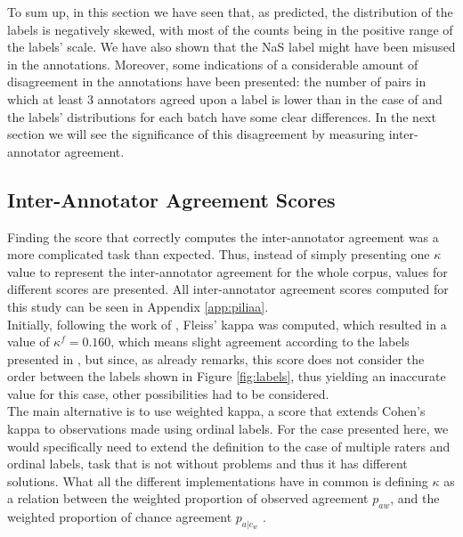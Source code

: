 To sum up, in this section we have seen that, as predicted, the distribution of the labels is negatively skewed, with most of the counts being in the positive range of the labels' scale. We have also shown that the NaS label might have been misused in the annotations. Moreover, some indications of a considerable amount of disagreement in the annotations have been presented: the number of pairs in which at least 3 annotators agreed upon a label is lower than in the case of \citet{de2012did} and the labels' distributions for each batch have some clear differences. In the next section we will see the significance of this disagreement by measuring inter-annotator agreement.\\ 

\subsection{Inter-Annotator Agreement Scores}

Finding the score that correctly computes the inter-annotator agreement was a more complicated task than expected. Thus, instead of simply presenting one $\kappa$ value to represent the inter-annotator agreement for the whole corpus, values for different scores are presented. All inter-annotator agreement scores computed for this study can be seen in Appendix \ref{app:piliaa}.\\

Initially, following the work of \citet{de2012did}, Fleiss' kappa \citep{fleiss1971measuring} was computed, which resulted in a value of $\kappa^{f} = 0.160$, which means slight agreement according to the labels presented in \citet{shrout1998measurement}, but since, as \citet{de2012did} already remarks, this score does not consider the order between the labels shown in Figure \ref{fig:labels}, thus yielding an inaccurate value for this case, other possibilities had to be considered.\\

The main alternative is to use weighted kappa, a score that extends Cohen's kappa \citep{cohen1960coefficient} to observations made using ordinal labels. For the case presented here, we would specifically need to extend the definition to the case of multiple raters and ordinal labels, task that is not without problems \citep{berry2008weighted,nelson2015measures} and thus it has different solutions. What all the different implementations have in common is defining $\kappa$ as a relation between the weighted proportion of observed agreement $p_{aw}$, and the weighted proportion of chance agreement $p_{a|c_w}$ \citep{vanacore2022robustness}.\\

